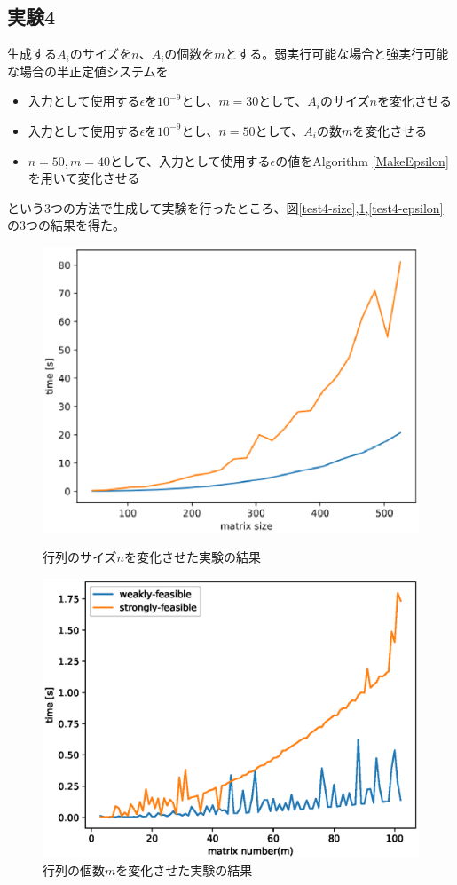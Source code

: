 \subsection{実験4}
生成する$A_i$のサイズを$n$、$A_i$の個数を$m$とする。弱実行可能な場合と強実行可能な場合\cite{FeasibleAnalysis}の半正定値システムを
\begin{itemize}
  \item 入力として使用する$\epsilon$を$10^{-9}$とし、$m = 30$として、$A_i$のサイズ$n$を変化させる
  \item 入力として使用する$\epsilon$を$10^{-9}$とし、$n = 50$として、$A_i$の数$m$を変化させる
  \item $n = 50, m = 40$として、入力として使用する$\epsilon$の値をAlgorithm \ref{MakeEpsilon}を用いて変化させる
\end{itemize}
という3つの方法で生成して実験を行ったところ、図\ref{test4-size},\ref{test4-number},\ref{test4-epsilon}の3つの結果を得た。
\begin{figure}
  \centering
  \includegraphics{size-times.eps}
  \caption{行列のサイズ$n$を変化させた実験の結果}
  \label{test4-size}

  \includegraphics{number-times.eps}
  \caption{行列の個数$m$を変化させた実験の結果}
  \label{test4-number}
\end{figure}
